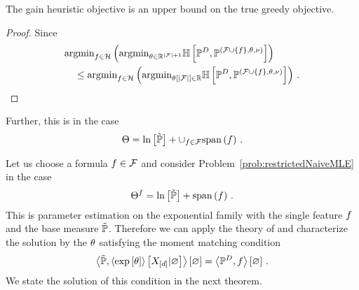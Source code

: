 \begin{lemma}
    The gain heuristic objective is an upper bound on the true greedy objective.
\end{lemma}
\begin{proof}
    Since
    \begin{align*}
        &\mathrm{argmin}_{f\in\mathcal{H}} \left( \mathrm{argmin}_{\theta\in\mathbb{R}^{\left|\mathcal{F}\right|+1}}
        \mathbb{H}\left[\mathbb{P}^{D},\mathbb{P}^{(\mathcal{F}\cup\{f\},\theta,\nu)}\right] \right) \\
        &\quad \leq    \mathrm{argmin}_{f\in\mathcal{H}} \left ( \mathrm{argmin}_{\theta\left[\left|\mathcal{F}\right|\right]\in\mathbb{R}}
        \mathbb{H}\left[\mathbb{P}^{D},\mathbb{P}^{(\mathcal{F}\cup\{f\},\theta,\nu)}\right] \right) \, .
    \end{align*}
\end{proof}


Further, this is  in the case
\begin{align*}
    \Theta = \ln \left[ \tilde{\mathbb{P}} \right] + \cup_{f\in\mathcal{F}} \mathrm{span}\left(f\right) \, .
\end{align*}


Let us choose a formula $f\in\mathcal{F}$ and consider Problem~\ref{prob:restrictedNaiveMLE}  in the case
\begin{align*}
    \Theta^{f} = \ln \left[ \tilde{\mathbb{P}} \right] + \mathrm{span}\left(f\right) \, .
\end{align*}
This is parameter estimation on the exponential family with the single feature $f$ and the base measure $\tilde{\mathbb{P}}$.
Therefore we can apply the theory of  and characterize the solution by the $\theta$ satisfying the moment matching condition
\begin{align*}
    \left\langle \tilde{\mathbb{P}}, \left\langle \mathrm{exp}\left[\theta\right]\right\rangle \left[ X_{[d]} | \varnothing \right] \right\rangle \left[ \varnothing \right] = \left\langle \mathbb{P}^{D}, f\right\rangle \left[ \varnothing \right] \, .
\end{align*}
We state the solution of this condition in the next theorem.

